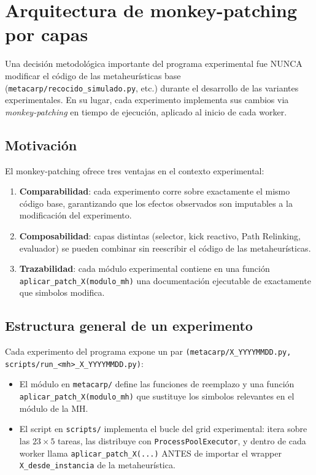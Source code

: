 \documentclass[11pt,a4paper]{article}
\theoremstyle{definition}
\theoremstyle{remark}
\begin{document}
\section{Arquitectura de monkey-patching por capas}
\label{sec:arquitectura-software}

Una decisión metodológica importante del programa experimental fue
NUNCA modificar el código de las metaheurísticas base
(\texttt{metacarp/recocido\_simulado.py}, etc.) durante el desarrollo
de las variantes experimentales. En su lugar, cada experimento
implementa sus cambios via \emph{monkey-patching} en tiempo de
ejecución, aplicado al inicio de cada worker.

\subsection{Motivación}

El monkey-patching ofrece tres ventajas en el contexto experimental:

\begin{enumerate}
\item \textbf{Comparabilidad}: cada experimento corre sobre exactamente
  el mismo código base, garantizando que los efectos observados son
  imputables a la modificación del experimento.
\item \textbf{Composabilidad}: capas distintas (selector, kick reactivo,
  Path Relinking, evaluador) se pueden combinar sin reescribir el
  código de las metaheurísticas.
\item \textbf{Trazabilidad}: cada módulo experimental contiene en una
  función \texttt{aplicar\_patch\_X(modulo\_mh)} una documentación
  ejecutable de exactamente que simbolos modifica.
\end{enumerate}

\subsection{Estructura general de un experimento}

Cada experimento del programa expone un par
\texttt{(metacarp/X\_YYYYMMDD.py, scripts/run\_<mh>\_X\_YYYYMMDD.py)}:

\begin{itemize}
\item El módulo en \texttt{metacarp/} define las funciones de
  reemplazo y una función \texttt{aplicar\_patch\_X(modulo\_mh)} que
  sustituye los simbolos relevantes en el módulo de la MH.
\item El script en \texttt{scripts/} implementa el bucle del grid
  experimental: itera sobre las $23 \times 5$ tareas, las distribuye
  con \texttt{ProcessPoolExecutor}, y dentro de cada worker llama
  \texttt{aplicar\_patch\_X(...)} ANTES de importar el wrapper
  \texttt{X\_desde\_instancia} de la metaheurística.
\end{itemize}
\end{document}
